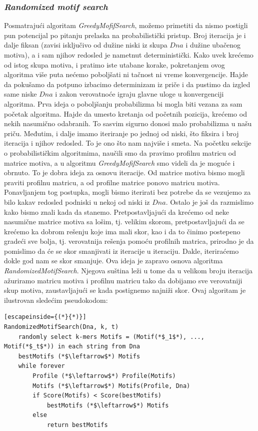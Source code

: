 \subsubsection{\textit{Randomized motif search}}
Posmatrajući algoritam \textit{GreedyMofifSearch}, možemo primetiti da nismo postigli pun potencijal po pitanju prelaska na probabilistički pristup. Broj iteracija je i dalje fiksan (zavisi isključivo od dužine niski iz skupa $Dna$ i dužine ubačenog motiva), a i sam njihov redosled je nametnut deterministički. Kako uvek krećemo od istog skupa motiva, i pratimo iste utabane korake, pokretanjem ovog algoritma više puta nećemo poboljšati ni tačnost ni vreme konvergencije. 
Hajde da pokušamo da potpuno izbacimo determinizam iz priče i da pustimo da izgled same niske $Dna$ i zakon verovatnoće igraju glavne uloge u konvergenciji algoritma. Prva ideja o poboljšanju probabilizma bi mogla biti vezana za sam početak algoritma. Hajde da umesto kretanja od početnih pozicija, krećemo od nekih nasumično odabranih. To sasvim sigurno donosi malo probabilizma u našu priču. Međutim, i dalje imamo iteriranje po jednoj od niski, što fiksira i broj iteracija i njihov redosled. To je ono što nam najviše i smeta. 
Na početku sekcije o probabilističkim algoritmima, naučili smo da pravimo profilnu matricu od matrice motiva, a u algoritmu \textit{GreedyMofifSearch} smo videli da je moguće i obrnuto. To je dobra ideja za osnovu iteracije. Od matrice motiva bismo mogli praviti profilnu matricu, a od profilne matrice ponovo matricu motiva. Ponavljanjem tog postupka, mogli bismo iterirati bez potrebe da se vezujemo za bilo kakav redosled podniski u nekoj od niski iz $Dna$. Ostalo je još da razmislimo kako bismo znali kada da stanemo. Pretpostavljajući da krećemo od neke nasumične matrice motiva sa lošim, tj. velikim skorom, pretpostavljajući da se krećemo ka dobrom rešenju koje ima mali skor, kao i da to činimo postepeno gradeći sve bolja, tj. verovatnija rešenja pomoću profilnih matrica, prirodno je da pomislimo da će se skor smanjivati iz iteracije u iteraciju. Dakle, iteriraćemo dokle god nam se skor smanjuje.
Ova ideja je zapravo osnova algoritma \textit{RandomizedMotifSearch}. Njegova suština leži u tome da u velikom broju iteracija ažuriramo matricu motiva i profilnu matricu tako da dobijamo sve verovatniji skup motiva, zaustavljajući se kada postignemo najniži skor. Ovaj algoritam je ilustrovan sledećim pseudokodom:

\begin{lstlisting}[escapeinside={(*}{*)}]
RandomizedMotifSearch(Dna, k, t)
    randomly select k-mers Motifs = (Motif(*$_1$*), ..., Motif(*$_t$*)) in each string from Dna
    bestMotifs (*$\leftarrow$*) Motifs
    while forever
        Profile (*$\leftarrow$*) Profile(Motifs)
        Motifs (*$\leftarrow$*) Motifs(Profile, Dna)
        if Score(Motifs) < Score(bestMotifs)
            bestMotifs (*$\leftarrow$*) Motifs
        else 
            return bestMotifs
\end{lstlisting}

